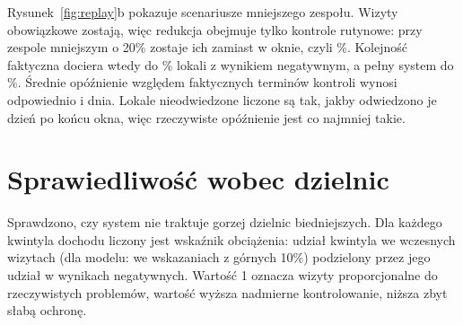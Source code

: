 \documentclass[11pt,a4paper]{article}
\begin{document}
Rysunek~\ref{fig:replay}b pokazuje scenariusze mniejszego zespołu. Wizyty obowiązkowe zostają,
więc redukcja obejmuje tylko kontrole rutynowe: przy zespole mniejszym o 20\% zostaje ich
\CapEighty{} zamiast \CapFull{} w oknie, czyli \CapShareEighty\%. Kolejność faktyczna dociera
wtedy do \ReachCity\% lokali z wynikiem negatywnym, a pełny system do \ReachSys\%. Średnie
opóźnienie względem faktycznych terminów kontroli wynosi odpowiednio \LateCity{} i \LateSys{}
dnia. Lokale
nieodwiedzone liczone są tak, jakby odwiedzono je dzień po końcu okna, więc rzeczywiste
opóźnienie jest co najmniej takie.

\section{Sprawiedliwość wobec dzielnic}
\label{sec:fair}

Sprawdzono, czy system nie traktuje gorzej dzielnic biedniejszych. Dla każdego kwintyla
dochodu liczony jest wskaźnik obciążenia: udział kwintyla we wczesnych wizytach (dla modelu:
we wskazaniach z górnych 10\%) podzielony przez jego udział w wynikach negatywnych. Wartość 1
oznacza wizyty proporcjonalne do rzeczywistych problemów, wartość wyższa nadmierne
kontrolowanie, niższa zbyt słabą ochronę.
\end{document}
